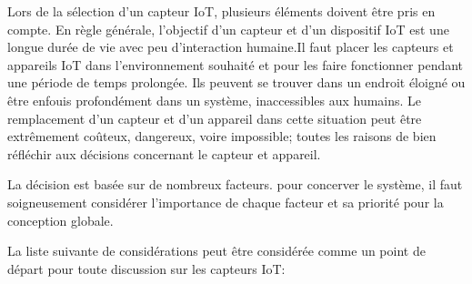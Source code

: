 Lors de la sélection d'un capteur IoT, plusieurs éléments doivent être pris en compte. En règle générale, l'objectif d'un capteur et d'un dispositif IoT est une longue durée de vie avec peu d'interaction humaine.Il faut placer les capteurs et appareils IoT dans l'environnement souhaité et pour les faire fonctionner pendant une période de temps prolongée. Ils peuvent se trouver dans un endroit éloigné ou être enfouis profondément dans un système, inaccessibles aux humains. Le remplacement d'un capteur et d'un appareil dans cette situation peut être extrêmement coûteux, dangereux, voire impossible; toutes les raisons de bien réfléchir aux décisions concernant le capteur et  appareil.


La décision est basée sur de nombreux facteurs. pour concerver le système, il faut soigneusement considérer l'importance de chaque facteur et sa priorité pour la conception globale.


La liste suivante de considérations peut être considérée comme un point de départ pour toute discussion sur les capteurs IoT:

